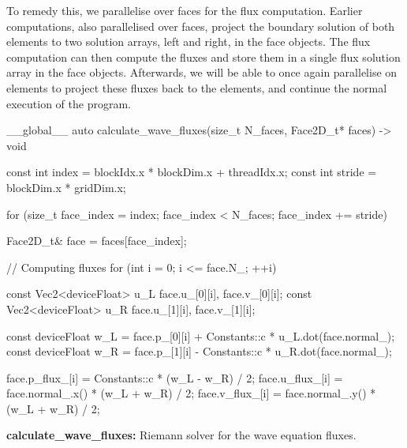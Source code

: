 To remedy this, we parallelise over faces for the flux computation. Earlier computations, also
parallelised over faces, project the boundary solution of both elements to two solution arrays, left
and right, in the face objects. The flux computation can then compute the fluxes and store them in a
single flux solution array in the face objects. Afterwards, we will be able to once again
parallelise on elements to project these fluxes back to the elements, and continue the normal
execution of the program.

\begin{algorithm}[H]
    \begin{cuda}
        __global__
        auto calculate_wave_fluxes(size_t N_faces, Face2D_t* faces) -> void {
            const int index = blockIdx.x * blockDim.x + threadIdx.x;
            const int stride = blockDim.x * gridDim.x;

            for (size_t face_index = index; face_index < N_faces; face_index += stride) {
                Face2D_t& face = faces[face_index];

                // Computing fluxes
                for (int i = 0; i <= face.N_; ++i) {
                    const Vec2<deviceFloat> u_L {face.u_[0][i], face.v_[0][i]};
                    const Vec2<deviceFloat> u_R {face.u_[1][i], face.v_[1][i]};

                    const deviceFloat w_L = face.p_[0][i] + Constants::c * u_L.dot(face.normal_);
                    const deviceFloat w_R = face.p_[1][i] - Constants::c * u_R.dot(face.normal_);

                    face.p_flux_[i] = Constants::c * (w_L - w_R) / 2;
                    face.u_flux_[i] = face.normal_.x() * (w_L + w_R) / 2;
                    face.v_flux_[i] = face.normal_.y() * (w_L + w_R) / 2;
                }
            }
        }\end{cuda}
\caption{\textbf{calculate\_wave\_fluxes:} Riemann solver for the wave equation fluxes.}\label{alg:wave_fluxes}
\end{algorithm}
